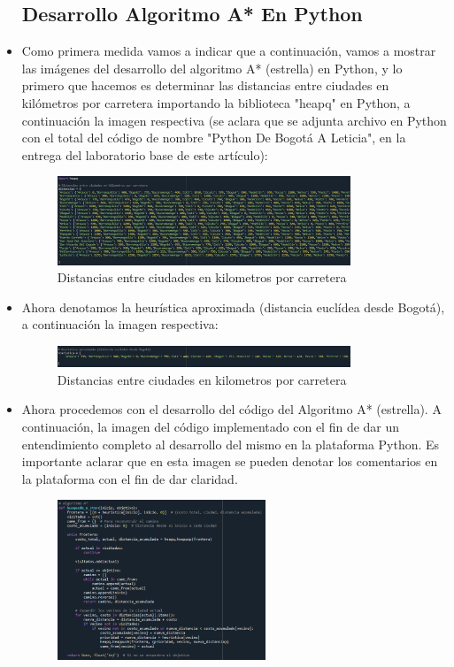\documentclass[conference]{IEEEtran}
\begin{document}
\begin{itemize}
	\subsection{Desarrollo Algoritmo A* En Python}
	\item Como primera medida vamos a indicar que a continuación, vamos a mostrar las imágenes del desarrollo del algoritmo A* (estrella) en Python, y lo primero que hacemos es determinar las distancias entre ciudades en kilómetros por carretera importando la biblioteca "heapq" en Python, a continuación la imagen respectiva (se aclara que se adjunta archivo en Python con el total del código de nombre "Python De Bogotá A Leticia", en la entrega del laboratorio base de este artículo):
		\begin{figure}[ht!] %
			\centering
			\includegraphics[width=3.45in]{Imagen22.png}
			\caption{Distancias entre ciudades en kilometros por carretera}
			\label{picture}
		\end{figure}
	\item Ahora denotamos la heurística aproximada (distancia euclídea desde Bogotá), a continuación la imagen respectiva:
		\begin{figure}[ht!] %
			\centering
			\includegraphics[width=3.45in]{Imagen23.png}
			\caption{Distancias entre ciudades en kilometros por carretera}
			\label{picture}
		\end{figure}
	\item Ahora procedemos con el desarrollo del código del Algoritmo A* (estrella).  A continuación, la imagen del código implementado con el fin de dar un entendimiento completo al desarrollo del mismo en la plataforma Python. Es importante aclarar que en esta imagen se pueden denotar los comentarios en la plataforma con el fin de dar claridad.
		\begin{figure}[ht!] %
			\centering
			\includegraphics[width=2.45in]{Imagen24.png}

\end{figure}
\end{itemize}
\end{document}
